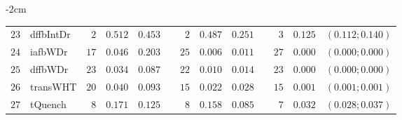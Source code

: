 \begin{table*}[!htbp]
\begin{adjustwidth*}{}{-2cm}
\begin{tabular}{@{}rlrrrrrrrrrcc@{}}
\footnotesize{$23$} & \footnotesize{dffbIntDr} & \footnotesize{$2 $} & \footnotesize{$0.512$} & \footnotesize{$0.453$} && \footnotesize{$2 $} & \footnotesize{$0.487$} & \footnotesize{$0.251$} && \footnotesize{$3 $} & \footnotesize{$0.125$} & \footnotesize{$(0.112;0.140)$} \\
\footnotesize{$24$} & \footnotesize{iafbWDr  } & \footnotesize{$17$} & \footnotesize{$0.046$} & \footnotesize{$0.203$} && \footnotesize{$25$} & \footnotesize{$0.006$} & \footnotesize{$0.011$} && \footnotesize{$27$} & \footnotesize{$0.000$} & \footnotesize{$(0.000;0.000)$} \\
\footnotesize{$25$} & \footnotesize{dffbWDr  } & \footnotesize{$23$} & \footnotesize{$0.034$} & \footnotesize{$0.087$} && \footnotesize{$22$} & \footnotesize{$0.010$} & \footnotesize{$0.014$} && \footnotesize{$23$} & \footnotesize{$0.000$} & \footnotesize{$(0.000;0.000)$} \\
\footnotesize{$26$} & \footnotesize{transWHT } & \footnotesize{$20$} & \footnotesize{$0.040$} & \footnotesize{$0.093$} && \footnotesize{$15$} & \footnotesize{$0.022$} & \footnotesize{$0.028$} && \footnotesize{$15$} & \footnotesize{$0.001$} & \footnotesize{$(0.001;0.001)$} \\
\footnotesize{$27$} & \footnotesize{tQuench  } & \footnotesize{$8 $} & \footnotesize{$0.171$} & \footnotesize{$0.125$} && \footnotesize{$8 $} & \footnotesize{$0.158$} & \footnotesize{$0.085$} && \footnotesize{$7 $} & \footnotesize{$0.032$} & \footnotesize{$(0.028;0.037)$} \\
\bottomrule
\end{tabular}
\end{adjustwidth*}
\end{table*}

